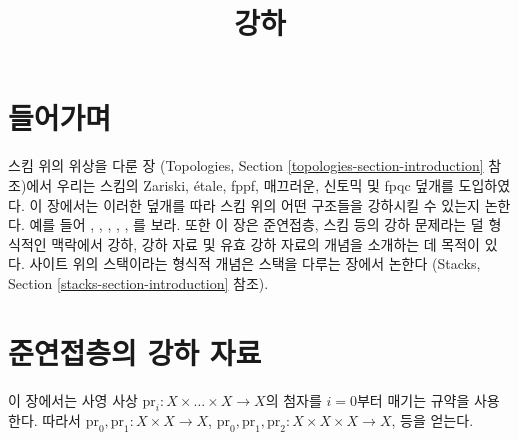 

%


\title{강하}

\maketitle

\label{section-phantom}

\tableofcontents

\section{들어가며}
\label{section-introduction}

\noindent
스킴 위의 위상을 다룬 장
(Topologies, Section \ref{topologies-section-introduction} 참조)에서 우리는
스킴의 Zariski, \'etale, fppf, 매끄러운, 신토믹 및 fpqc 덮개를 도입하였다.
이 장에서는 이러한 덮개를 따라 스킴 위의 어떤 구조들을 강하시킬 수 있는지
논한다. 예를 들어 \cite{Gr-I}, \cite{Gr-II}, \cite{Gr-III},
\cite{Gr-IV}, \cite{Gr-V}, \cite{Gr-VI}를 보라.
또한 이 장은 준연접층, 스킴 등의 강하 문제라는 덜 형식적인 맥락에서
강하, 강하 자료 및 유효 강하 자료의 개념을 소개하는 데 목적이 있다.
사이트 위의 스택이라는 형식적 개념은 스택을 다루는 장에서 논한다
(Stacks, Section \ref{stacks-section-introduction} 참조).

\section{준연접층의 강하 자료}
\label{section-equivalence}

\noindent
이 장에서는 사영 사상
$\text{pr}_i : X \times \ldots \times X \to X$의 첨자를 $i = 0$부터
매기는 규약을 사용한다. 따라서
$\text{pr}_0, \text{pr}_1 : X \times X  \to X$,
$\text{pr}_0, \text{pr}_1, \text{pr}_2 : X \times X \times X  \to X$,
등을 얻는다.



